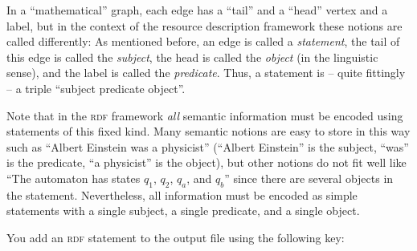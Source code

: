 In a ``mathematical'' graph, each edge has a ``tail'' and a ``head'' vertex and
a label, but in the context of the resource description framework these notions
are called differently: As mentioned before, an edge is called a
\emph{statement}, the tail of this edge is called the \emph{subject}, the head
is called the \emph{object} (in the linguistic sense), and the label is called
the \emph{predicate}. Thus, a statement is -- quite fittingly -- a triple
``subject predicate object''.

Note that in the \textsc{rdf} framework \emph{all} semantic information must be
encoded using statements of this fixed kind. Many semantic notions are easy to
store in this way such as ``Albert Einstein was a physicist'' (``Albert
Einstein'' is the subject, ``was'' is the predicate, ``a physicist'' is the
object), but other notions do not fit well like ``The automaton has states
$q_1$, $q_2$, $q_a$, and $q_b$'' since there are several objects in the
statement. Nevertheless, all information must be encoded as simple statements
with a single subject, a single predicate, and a single object.

You add an \textsc{rdf} statement to the output file using the following key:

